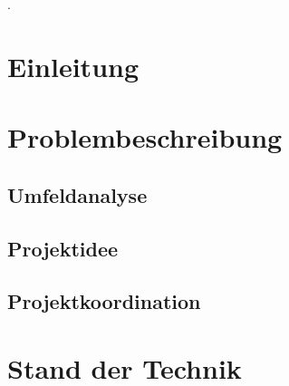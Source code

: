 \documentclass[12pt]{article}
\newcommand\blankpage{%
    \null
    \thispagestyle{empty}%
    \addtocounter{page}{-1}%
    \newpage}
\begin{document}
\newpage

\afterpage{\blankpage}



\newpage

\cfoot{}
{\small\color{white}.}
\vspace{-0.7cm}
\renewcommand*\contentsname{Inhalt}
\tableofcontents

\newpage %

\ofoot{\pagemark}

\section{Einleitung}
\label{sec:einleitung}


\section{Problembeschreibung}
\label{sec:problembeschreibung}


\subsection{Umfeldanalyse}
\label{subsec:umfeldanalyse}


\newpage

\subsection{Projektidee}
\label{subsec:projektidee}


\subsection{Projektkoordination}
\label{subsec:projektkoordination}


\newpage

\section{Stand der Technik}
\label{sec:standdertechnik}

\end{document}
